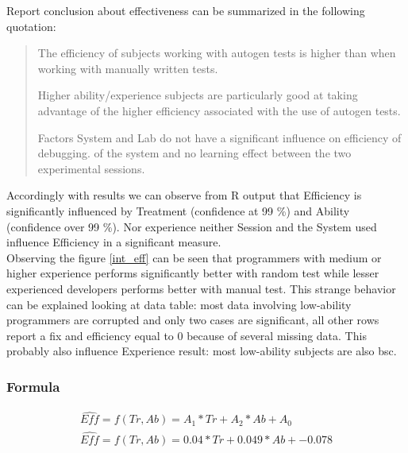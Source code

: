 Report conclusion about effectiveness can be summarized in the following quotation:
\begin{quote}
	\begin{itemize}
	 The efficiency of subjects working with autogen tests is higher than when working with manually	written tests.  
	
	 Higher ability/experience subjects are particularly	good at taking advantage of the higher efficiency associated with the use of autogen tests.
	
	 Factors System and Lab do not have a significant influence on efficiency of debugging.
	of the system and no learning effect between the two experimental sessions.

	\end{itemize}
\end{quote}
Accordingly with results we can observe from R output that Efficiency is significantly influenced by Treatment (confidence at 99 \%) and Ability (confidence over 99 \%). Nor experience neither Session and the System used influence Efficiency in a significant measure.\\
Observing the figure \ref{int_eff} can be seen that programmers with medium or higher experience performs significantly better with random test while lesser experienced developers performs better with manual test. This strange behavior can be explained looking at data table: most data involving low-ability programmers are corrupted and only two cases are significant, all other rows report a fix and efficiency equal to 0 because of several missing data. This probably also influence Experience result: most low-ability subjects are also bsc.

\subsubsection{Formula}
\begin{equation}
\begin{split}
	\hat{Eff} = f(Tr, Ab) = A_{1}*Tr + A_{2}*Ab + A_{0} \\
	\hat{Eff} = f(Tr, Ab) = 0.04*Tr + 0.049*Ab + -0.078
\end{split}
\end{equation}